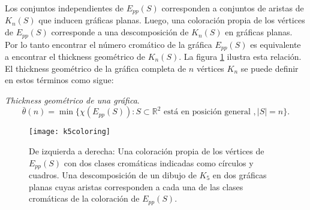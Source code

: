 Los conjuntos independientes de $E_{pp}(S)$ corresponden a conjuntos de aristas
de $K_n(S)$ que inducen gráficas planas. Luego, una coloración propia de los
vértices de $E_{pp}(S)$ corresponde a una descomposición de $K_n(S)$ en
gráficas planas.
Por lo tanto encontrar el número cromático de la gráfica
$E_{pp}(S)$ es equivalente a encontrar el thickness geométrico de $K_n(S)$.
La figura \ref{fig:k5coloring} ilustra esta relación.
El thickness geométrico de la gráfica completa de $n$ vértices $K_n$ se puede
definir en estos términos como sigue:
\begin{definition}{\emph{Thickness geométrico de una gráfica}.}
  \[\bar{\theta}(n) = \min\{ \chi(E_{pp}(S)): S \subset \mathbb{R}^2 \text{ está en posición general }, |S|=n \}.\]
\end{definition}
\begin{figure}
  \centering
  \texttt{[image: k5coloring]}
  \caption{De izquierda a derecha: Una coloración propia de los vértices de $E_{pp}(S)$ con dos
  clases cromáticas indicadas como círculos y cuadros.
  Una descomposición de un dibujo de $K_5$ en dos gráficas planas
  cuyas aristas corresponden a cada una de las clases cromáticas de la coloración
  de $E_{pp}(S)$.}
  \label{fig:k5coloring}
\end{figure}




